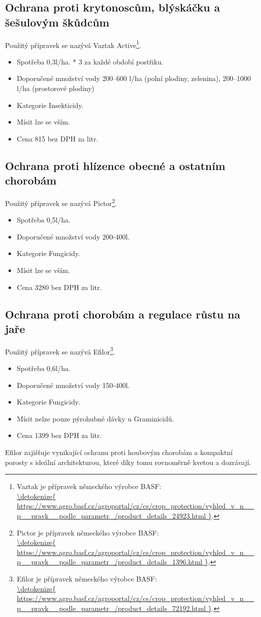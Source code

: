 \documentclass[11pt,a4paper,titlepage]{article}
\begin{document}
\subsection{Ochrana proti krytonoscům, blýskáčku a šešulovým škůdcům}
Použitý přípravek se nazývá Vaztak Active\footnote{Vaztak je přípravek německého výrobce BASF: \\\url{\detokenize{
https://www.agro.basf.cz/agroportal/cz/cs/crop_protection/vyhled_v_n__p__pravk__podle_parametr_/product_details_24923.html
}}.}.
\begin{itemize}
  \item Spotřeba 0,3l/ha. * 3 za každé období postřiku.
  \item Doporučené množství vody 200–600 l/ha (polní plodiny, zelenina), 200–1000 l/ha (prostorové plodiny) 
  \item Kategorie Insekticidy.
  \item Mísit lze se vším.
  \item Cena 815 bez DPH za litr.
\end{itemize}

\subsection{Ochrana proti hlízence obecné a ostatním chorobám}
Použitý přípravek se nazývá Pictor\footnote{Pictor je přípravek německého výrobce BASF: \\\url{\detokenize{
https://www.agro.basf.cz/agroportal/cz/cs/crop_protection/vyhled_v_n__p__pravk__podle_parametr_/product_details_1396.html
}}.}.
\begin{itemize}
  \item Spotřeba 0,5l/ha.
  \item Doporučené množství vody 200-400l.
  \item Kategorie Fungicidy.
  \item Mísit lze se vším.
  \item Cena 3280 bez DPH za litr.
\end{itemize}

\subsection{Ochrana proti chorobám a regulace růstu na jaře}
Použitý přípravek se nazývá Efilor\footnote{Efilor je přípravek německého výrobce BASF: \\\url{\detokenize{
https://www.agro.basf.cz/agroportal/cz/cs/crop_protection/vyhled_v_n__p__pravk__podle_parametr_/product_details_72192.html
}}.}.
\begin{itemize}
  \item Spotřeba 0,6l/ha.
  \item Doporučené množství vody 150-400l.
  \item Kategorie Fungicidy.
  \item Mísit nelze pouze pýrohubné dávky u Graminicidů.
  \item Cena 1399 bez DPH za litr.
\end{itemize}
Efilor zajišťuje vynikající ochranu proti houbovým chorobám a kompaktní porosty s ideální architekturou, které díky tomu rovnoměrně kvetou a dozrávají.
\end{document}
